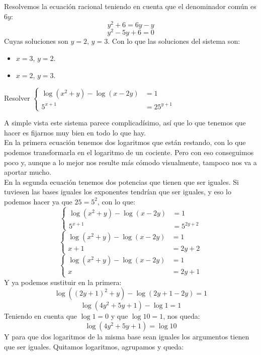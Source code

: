 \documentclass[a4paper,11pt,answers]{exam}
\begin{document}
\begin{questions}
\begin{solution}
      Resolvemos la ecuación racional teniendo en cuenta que el denominador común es $6y$:
      \[y^2 + 6 = 6y -y\]
      \[y^2 - 5y + 6 = 0\]
      Cuyas soluciones son $y=2$, $y=3$. Con lo que las soluciones del sistema son:
      \begin{itemize}
      \item $x=3$, $y=2$.
      \item $x=2$, $y=3$.
      \end{itemize}
    \end{solution}
  \question Resolver $
    \begin{cases}
      \log (x^2+ y) - \log(x-2y) &= 1\\
      5^{x+1} &= 25^{y+1}
    \end{cases}$
    \begin{solution}
      A simple vista este sistema parece complicadísimo, así que lo que tenemos que hacer es fijarnos muy bien en todo
      lo que hay.\\
      En la primera ecuación tenemos dos logaritmos que están restando, con lo que podemos transformarla en el
      logaritmo de un cociente. Pero con eso conseguimos poco y, aunque a lo mejor nos resulte más cómodo
      visualmente, tampoco nos va a aportar mucho.\\
      En la segunda ecuación tenemos dos potencias que tienen que ser iguales. Si tuviesen las bases iguales los
      exponentes tendrían que ser iguales, y eso lo podemos hacer ya que $25=5^2$, con lo que:
      \[\begin{cases}
      \log (x^2+ y) - \log(x-2y) &= 1\\
      5^{x+1} &= 5^{2y+2}
        \end{cases}\]
      \[\begin{cases}
      \log (x^2+ y) - \log(x-2y) &= 1\\
      x+1 &= 2y + 2
        \end{cases}\]
      \[\begin{cases}
      \log (x^2+ y) - \log(x-2y) &= 1\\
      x &= 2y +1
        \end{cases}\]
      Y ya podemos sustituir en la primera:
      \[\log \left((2y+1)^2 + y\right) - \log (2y + 1 - 2y) = 1\]
      \[\log (4y^2 + 5y + 1 ) - \log 1 = 1\]
      Teniendo en cuenta que $\log 1 = 0$ y que $\log 10 = 1$, nos queda:
      \[\log (4y^2 + 5y + 1 ) = \log 10\]
      Y para que dos logaritmos de la misma base sean iguales los argumentos tienen que ser iguales.
      Quitamos logaritmos, agrupamos y queda:

\end{solution}
\end{questions}
\end{document}
